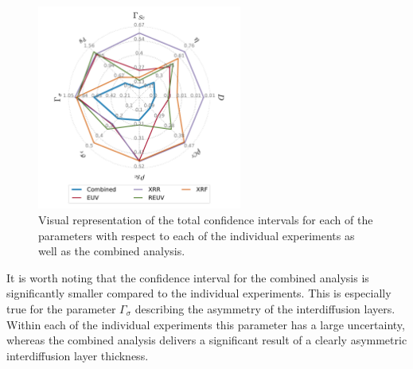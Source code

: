 \begin{figure}[htbp]
  \centering
  
\includegraphics[width=0.6\textwidth]{images/spiderplot_confidence_intervals_empty}
  \caption{Visual representation of the total confidence intervals for each of 
the parameters with respect to each of the individual experiments as well as 
the combined analysis.}
  \label{fig:confidence_intervals}
\end{figure}
It is worth noting that the confidence interval for the combined analysis is 
significantly smaller compared to the individual experiments. This is 
especially true for the parameter $\Gamma_\sigma$ describing the asymmetry of 
the interdiffusion layers. Within each of the individual experiments this 
parameter has a large uncertainty, whereas the combined analysis delivers a 
significant result of a clearly asymmetric interdiffusion layer thickness.



